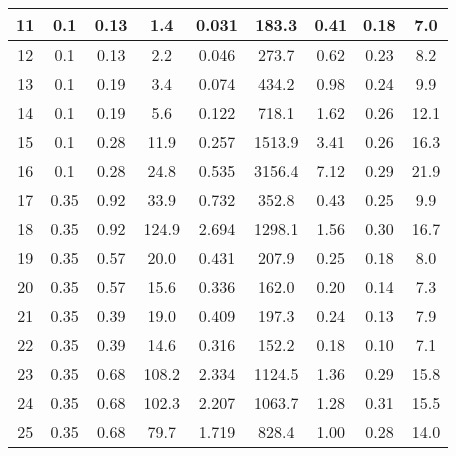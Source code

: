 \begin{table}[!h]
\begin{center}
\begin{tabular}{|c|c|c|c|c|c|c||c|c|}
11       & 0.1      & 0.13       & 1.4         &  0.031                &  183.3         & 0.41          & 0.18      & 7.0          \\ \hline
12       & 0.1      & 0.13       & 2.2         &  0.046                &  273.7         & 0.62          & 0.23      & 8.2          \\ \hline
13       & 0.1      & 0.19       & 3.4         &  0.074                &  434.2         & 0.98          & 0.24      & 9.9          \\ \hline
14       & 0.1      & 0.19       & 5.6         &  0.122                &  718.1         & 1.62          & 0.26      & 12.1          \\ \hline
15       & 0.1      & 0.28       & 11.9        &  0.257                &  1513.9        & 3.41          & 0.26      & 16.3          \\ \hline
16       & 0.1      & 0.28       & 24.8        &  0.535                &  3156.4        & 7.12          & 0.29      & 21.9          \\ \hline
17       & 0.35     & 0.92       & 33.9        &  0.732                &  352.8         & 0.43          & 0.25      & 9.9          \\ \hline
18       & 0.35     & 0.92       & 124.9       &  2.694                &  1298.1        & 1.56          & 0.30      & 16.7          \\ \hline
19       & 0.35     & 0.57       & 20.0        &  0.431                &  207.9         & 0.25          & 0.18      & 8.0          \\ \hline
20       & 0.35     & 0.57       & 15.6        &  0.336                &  162.0         & 0.20          & 0.14      & 7.3          \\ \hline
21       & 0.35     & 0.39       & 19.0        &  0.409                &  197.3         & 0.24          & 0.13      & 7.9          \\ \hline
22       & 0.35     & 0.39       & 14.6        &  0.316                &  152.2         & 0.18          & 0.10      & 7.1          \\ \hline
23       & 0.35     & 0.68       & 108.2       &  2.334                &  1124.5        & 1.36          & 0.29      & 15.8          \\ \hline
24       & 0.35     & 0.68       & 102.3       &  2.207                &  1063.7        & 1.28          & 0.31      & 15.5          \\ \hline
25       & 0.35     & 0.68       & 79.7        &  1.719                &  828.4         & 1.00          & 0.28      & 14.0          \\ \hline

\end{tabular}
\end{center}
\end{table}
